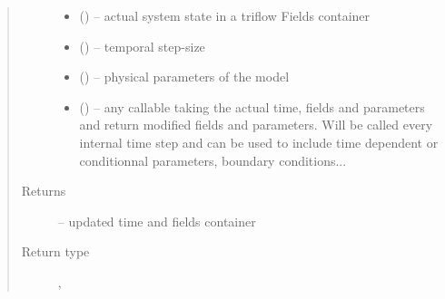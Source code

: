 \documentclass[letterpaper,10pt,english]{sphinxmanual}
\begin{document}
\begin{fulllineitems}
\begin{fulllineitems}
\begin{quote}
\begin{description}
\begin{itemize}
\item {} 
 () -- actual system state in a triflow Fields container

\item {} 
 () -- temporal step-size

\item {} 
 () -- physical parameters of the model

\item {} 
 (\sphinxstyleliteralemphasis{, }) -- any callable taking the actual time, fields and parameters and return modified fields and parameters. Will be called every internal time step and can be used to include time dependent or conditionnal parameters, boundary conditions...

\end{itemize}

\item[{Returns}] \leavevmode
{} -- updated time and fields container

\item[{Return type}] \leavevmode
{\hyperref[\detokenize{triflow.core:triflow.core.simulation.Simulation.t}]{}}, {\hyperref[\detokenize{triflow.core:module-triflow.core.fields}]{}}

\end{description}\end{quote}

\end{fulllineitems}


\end{fulllineitems}

\end{document}
